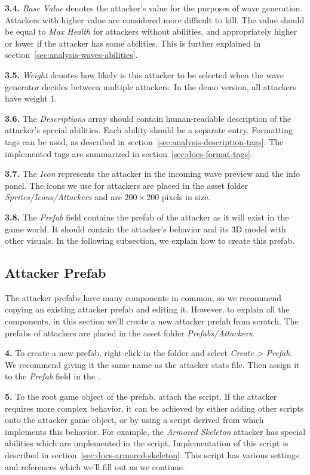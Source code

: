 \textbf{3.4.}
\emph{Base Value} denotes the attacker's value for the purposes of wave generation.
Attackers with higher value are considered more difficult to kill.
The value should be equal to \emph{Max Health} for attackers without abilities, and appropriately higher or lower if the attacker has some abilities.
This is further explained in section~\ref{sec:analysis-waves-abilities}.

\textbf{3.5.}
\emph{Weight} denotes how likely is this attacker to be selected when the wave generator decides between multiple attackers.
In the demo version, all attackers have weight 1.

\textbf{3.6.}
The \emph{Descriptions} array should contain human-readable description of the attacker's special abilities.
Each ability should be a separate entry.
Formatting tags can be used, as described in section~\ref{sec:analysis-description-tags}.
The implemented tags are summarized in section~\ref{sec:docs-format-tags}.

\textbf{3.7.}
The \emph{Icon} represents the attacker in the incoming wave preview and the info panel.
The icons we use for attackers are placed in the asset folder \emph{Sprites/Icons/Attackers} and are $200\times200$ pixels in size.

\textbf{3.8.}
The \emph{Prefab} field contains the prefab of the attacker as it will exist in the game world.
It should contain the attacker's behavior and its 3D model with other visuals.
In the following subsection, we explain how to create this prefab.

\subsection{Attacker Prefab}

The attacker prefabs have many components in common, so we recommend copying an existing attacker prefab and editing it.
However, to explain all the components, in this section we'll create a new attacker prefab from scratch.
The prefabs of attackers are placed in the asset folder \emph{Prefabs/Attackers}.

\textbf{4.}
To create a new prefab, right-click in the folder and select \emph{Create > Prefab}.
We recommend giving it the same name as the attacker stats file.
Then assign it to the \emph{Prefab} field in the .

\textbf{5.}
To the root game object of the prefab, attach the  script.
If the attacker requires more complex behavior, it can be achieved by either adding other scripts onto the attacker game object, or by using a script derived from  which implements this behavior.
For example, the \emph{Armored Skeleton} attacker has special abilities which are implemented in the  script.
Implementation of this script is described in section~\ref{sec:docs-armored-skeleton}.
This script has various settings and references which we'll fill out as we continue.

